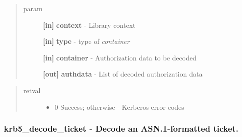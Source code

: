 \documentclass[letterpaper,10pt,english]{sphinxmanual}
\begin{document}
\begin{fulllineitems}
\label{appdev/refs/api/krb5_decode_authdata_container:krb5_decode_authdata_container}
\end{fulllineitems}

\begin{quote}\begin{description}
\item[{param}] \leavevmode
\textbf{{[}in{]}} \textbf{context} - Library context

\textbf{{[}in{]}} \textbf{type} -  type of \emph{container}

\textbf{{[}in{]}} \textbf{container} - Authorization data to be decoded

\textbf{{[}out{]}} \textbf{authdata} - List of decoded authorization data

\end{description}\end{quote}
\begin{quote}\begin{description}
\item[{retval}] \leavevmode\begin{itemize}
\item {} 
0   Success; otherwise - Kerberos error codes

\end{itemize}

\end{description}\end{quote}




{\hyperref[appdev/refs/api/krb5_encode_authdata_container:krb5_encode_authdata_container]{}}




\subsubsection{krb5\_decode\_ticket -  Decode an ASN.1-formatted ticket.}
\label{appdev/refs/api/krb5_decode_ticket::doc}\label{appdev/refs/api/krb5_decode_ticket:krb5-decode-ticket-decode-an-asn-1-formatted-ticket}
\end{document}
